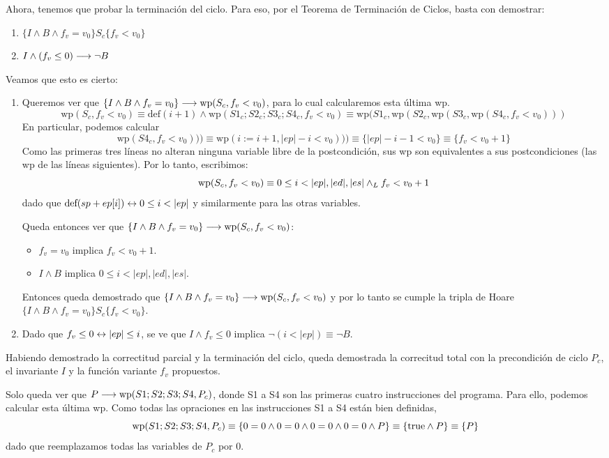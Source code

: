 \documentclass[10pt,a4paper]{article}
\renewcommand{\wp}{\text{wp}}
\newcommand{\isDef}{\text{def}}
\begin{document}
Ahora, tenemos que probar la terminación del ciclo. Para eso, por el Teorema de Terminación de Ciclos, basta con demostrar:
\begin{enumerate}
    \item $\{I \land B \land f_v = v_0\}S_c\{f_v < v_0\}$
    \item $I \land (f_v \leq 0) \longrightarrow \neg B$
\end{enumerate}
Veamos que esto es cierto:
\begin{enumerate}
    \item Queremos ver que $\{I \land B \land f_v = v_0\} \implica \wp(S_c, f_v < v_0)$, para lo cual calcularemos esta última wp.
    $$\wp(S_c, f_v < v_0) \equiv \isDef(i+1)\land \wp(S1_c; S2_c; S3_c; S4_c, f_v < v_0)\equiv \wp(S1_c, \wp(S2_c, \wp(S3_c, \wp(S4_c, f_v < v_0)))$$
    En particular, podemos calcular
    $$\wp(S4_c, f_v < v_0))) \equiv \wp(i := i + 1, |ep| - i < v_0))) \equiv \{|ep| - i - 1 < v_0\} \equiv \{f_v < v_0 + 1\}$$
    Como las primeras tres líneas no alteran ninguna variable libre de la postcondición, sus wp son equivalentes a sus postcondiciones (las wp de las líneas siguientes). Por lo tanto, escribimos:
    $$\wp(S_c, f_v < v_0) \equiv 0\leq i < |ep|, |ed|, |es| \yLuego f_v < v_0 + 1$$
    dado que $\isDef(sp + ep[i])\Iff 0\leq i < |ep|$ y similarmente para las otras variables.
    
    Queda entonces ver que $\{I \land B \land f_v = v_0\} \implica \wp(S_c, f_v < v_0)$:
    \begin{itemize}
        \item $f_v = v_0$ implica $f_v < v_0 + 1$.
        \item $I \land B$ implica $0 \leq i < |ep|, |ed|, |es|$.
    \end{itemize}
    Entonces queda demostrado que $\{I \land B \land f_v = v_0\}\implica \wp(S_c, f_v < v_0)$ y por lo tanto se cumple la tripla de Hoare $\{I \land B \land f_v = v_0\}S_c\{f_v < v_0\}$.
    
    \item Dado que $f_v \leq 0 \leftrightarrow |ep| \leq i$, se ve que $I \land f_v \leq 0$ implica $\neg (i < |ep|) \equiv \neg B$.
\end{enumerate}

Habiendo demostrado la correctitud parcial y la terminación del ciclo, queda demostrada la correcitud total con la precondición de ciclo $P_c$, el invariante $I$ y la función variante $f_v$ propuestos.

Solo queda ver que $P \implica \wp(S1;S2;S3;S4, P_c)$, donde S1 a S4 son las primeras cuatro instrucciones del programa. Para ello, podemos calcular esta última wp. Como todas las opraciones en las instrucciones S1 a S4 están bien definidas,
$$\wp(S1;S2;S3;S4,P_c) \equiv \{0 = 0\land 0 = 0\land 0 = 0\land 0 = 0\land P\} \equiv \{\True\land P\} \equiv \{P\}$$
dado que reemplazamos todas las variables de $P_c$ por $0$.
\end{document}
